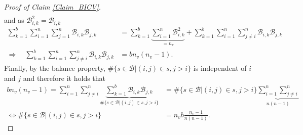 \documentclass[Research_Module_ES.tex]{subfiles}
\begin{document}
\begin{proof}[Proof of Claim \ref{Claim_BICV}]
\begin{align*}
	\end{align*}
	and as $\mathcal{B}_{i,k}^2=\mathcal{B}_{i,k}$
	\begin{align*}
	\sum_{k=1}^b\sum_{i=1}^n\sum_{j=1}^n\mathcal{B}_{i,k}\mathcal{B}_{j,k} &= \sum_{k=1}^b\underbrace{\sum_{i=1}^n\mathcal{B}_{i,k}^2}_{=n_v} +\sum_{k=1}^b\sum_{i=1}^n\sum_{j\neq i}^n\mathcal{B}_{i,k}\mathcal{B}_{j,k}\\
	\Rightarrow \quad \sum_{k=1}^b\sum_{i=1}^n\sum_{j\neq i}^n\mathcal{B}_{i,k}\mathcal{B}_{j,k} &= bn_v(n_v-1).
	\end{align*}
	Finally, by the balance property, $\#\{s\in\mathcal{B}|(i,j)\in s, j>i\}$ is independent of $i$ and $j$ and therefore it holds that
	\begin{align*}
	bn_v(n_v-1) = \sum_{i=1}^n\sum_{j\neq i}^n\underbrace{\sum_{k=1}^b\mathcal{B}_{i,k}\mathcal{B}_{j,k}}_{\#\{s\in\mathcal{B}|(i,j)\in s, j>i\}}&=\#\{s\in\mathcal{B}|(i,j)\in s, j>i\}\underbrace{\sum_{i=1}^n\sum_{j\neq i}^n}_{n(n-1)}\\
	\iff \#\{s\in\mathcal{B}|(i,j)\in s, j>i\}&=n_vb\frac{n_v-1}{n(n-1)}.
	\end{align*}
\end{proof} 
\end{document}
